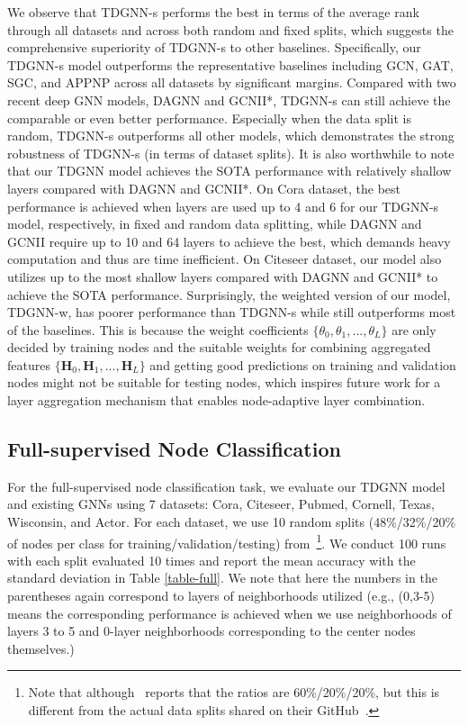 We observe that TDGNN-s performs the best in terms of the average rank through all datasets and across both random and fixed splits, which suggests the comprehensive superiority of TDGNN-s to other baselines. Specifically, our TDGNN-s model outperforms the representative baselines including GCN, GAT, SGC, and APPNP across all datasets by significant margins. Compared with two recent deep GNN models, DAGNN and GCNII*, TDGNN-s can still achieve the comparable or even better performance. Especially when the data split is random, TDGNN-s outperforms all other models, which demonstrates the strong robustness of TDGNN-s (in terms of dataset splits). It is also worthwhile to note that our TDGNN model achieves the SOTA performance with relatively shallow layers compared with DAGNN and GCNII*. On Cora dataset, the best performance is achieved when layers are used up to 4 and 6 for our TDGNN-s model, respectively, in fixed and random data splitting, while DAGNN and GCNII require up to 10 and 64 layers to achieve the best, which demands heavy computation and thus are time inefficient. On Citeseer dataset, our model also utilizes up to the most shallow layers compared with DAGNN and GCNII* to achieve the SOTA performance. Surprisingly, the weighted version of our model, TDGNN-w, has poorer performance than TDGNN-s while still outperforms most of the baselines. This is because the weight coefficients $\{\theta_0, \theta_1, ..., \theta_L\}$ are only decided by training nodes and the suitable weights for combining aggregated features $\{\mathbf{H}_{0}, \mathbf{H}_{1}, ..., \mathbf{H}_{L}\}$ and getting good predictions on training and validation nodes might not be suitable for testing nodes, which inspires future work for a layer aggregation mechanism that enables node-adaptive layer combination.

\vspace{-0.75ex}
\subsection{Full-supervised Node Classification}
For the full-supervised node classification task, we evaluate our TDGNN model and existing GNNs using 7 datasets: Cora, Citeseer, Pubmed, Cornell, Texas, Wisconsin, and Actor. For each dataset, we use 10 random splits (48\%/32\%/20\% of nodes per class for training/validation/testing) from~\cite{geomgcn}\footnote{Note that although~\cite{geomgcn} reports that the ratios are 60\%/20\%/20\%, but this is different from the actual data splits shared on their GitHub~\cite{coin}.}. We conduct 100 runs with each split evaluated 10 times and report the mean accuracy with the standard deviation in Table \ref{table-full}. We note that here the numbers in the parentheses again correspond to layers of neighborhoods utilized (e.g., (0,3-5) means the corresponding performance is achieved when we use neighborhoods of layers 3 to 5 and $0$-layer neighborhoods corresponding to the center nodes themselves.) 

